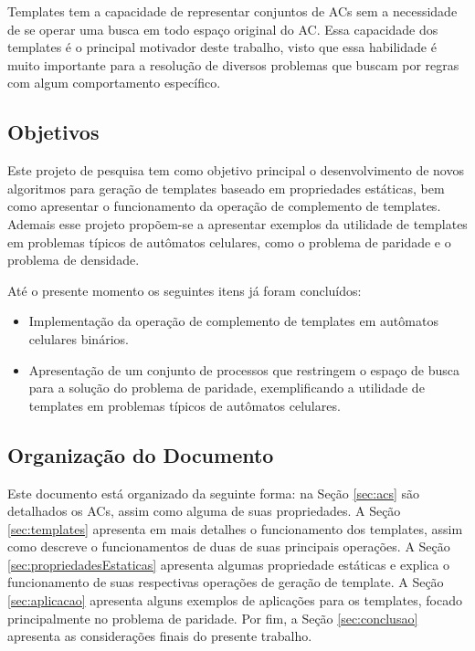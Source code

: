 \documentclass[12pt,a4paper]{article}
\begin{document}
Templates tem a capacidade de representar conjuntos de ACs sem a necessidade de se operar uma busca em todo espaço original do AC. Essa capacidade dos templates é o principal motivador deste trabalho, visto que essa habilidade é muito importante para a resolução de diversos problemas que buscam por regras com algum comportamento específico.

\subsection{Objetivos}
Este projeto de pesquisa tem como objetivo principal o desenvolvimento de novos algoritmos para geração de templates baseado em propriedades estáticas, bem como apresentar o funcionamento da operação de complemento de templates. Ademais esse projeto propõem-se a apresentar exemplos da utilidade de templates em problemas típicos de autômatos celulares, como o problema de paridade e o problema de densidade.

Até o presente momento os seguintes itens já foram concluídos:
      \begin{itemize}
          \item Implementação da operação de complemento de templates em autômatos celulares binários.
          \item Apresentação de um conjunto de processos que restringem o espaço de busca para a solução do problema de paridade, exemplificando a utilidade de templates em problemas típicos de autômatos celulares.
      \end{itemize}

\subsection{Organização do Documento}
Este documento está organizado da seguinte forma: na Seção \ref{sec:acs} são detalhados os ACs, assim como alguma de suas propriedades. A Seção \ref{sec:templates} apresenta em mais detalhes o funcionamento dos templates, assim como descreve o funcionamentos de duas de suas principais operações. A Seção \ref{sec:propriedadesEstaticas} apresenta algumas propriedade estáticas e explica o funcionamento de suas respectivas operações de geração de template. A Seção \ref{sec:aplicacao} apresenta alguns exemplos de aplicações para os templates, focado principalmente no problema de paridade. Por fim, a Seção \ref{sec:conclusao} apresenta as considerações finais do presente trabalho.
\end{document}
